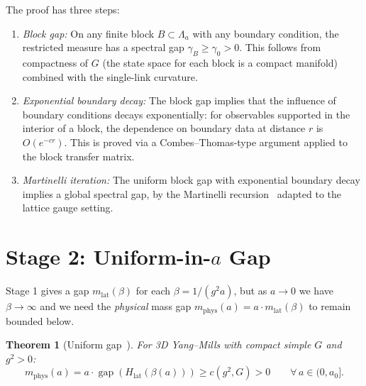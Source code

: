 \documentclass[11pt,a4paper]{article}
\theoremstyle{plain}
\newtheorem{theorem}{Theorem}[section]
\theoremstyle{definition}
\theoremstyle{remark}
\newcommand{\gap}{\operatorname{gap}}
\begin{document}
The proof has three steps:
\begin{enumerate}[label=(\alph*),nosep]
  \item \emph{Block gap:} On any finite block $B \subset
    \Lambda_a$ with any boundary condition, the restricted
    measure has a spectral gap $\gamma_B \ge \gamma_0 > 0$.
    This follows from compactness of $G$ (the state space
    for each block is a compact manifold) combined with the
    single-link curvature.
  \item \emph{Exponential boundary decay:} The block gap
    implies that the influence of boundary conditions
    decays exponentially: for observables supported in
    the interior of a block, the dependence on boundary
    data at distance $r$ is $O(e^{-cr})$.
    This is proved via a Combes--Thomas-type argument
    applied to the block transfer matrix.
  \item \emph{Martinelli iteration:} The uniform block gap
    with exponential boundary decay implies a global
    spectral gap, by the Martinelli recursion~\cite{Martinelli99}
    adapted to the lattice gauge setting.
\end{enumerate}

\section{Stage 2: Uniform-in-$a$ Gap}\label{sec:uniform}

Stage 1 gives a gap $m_{\mathrm{lat}}(\beta)$ for each
$\beta = 1/(g^2 a)$, but as $a \to 0$ we have $\beta \to \infty$
and we need the \emph{physical} mass gap
$m_{\mathrm{phys}}(a) = a \cdot m_{\mathrm{lat}}(\beta)$
to remain bounded below.

\begin{theorem}[Uniform gap~\cite{FontesUniform}]
\label{thm:uniform}
For 3D Yang--Mills with compact simple $G$ and $g^2 > 0$:
\begin{equation}
  m_{\mathrm{phys}}(a) =
  a \cdot \gap(H_{\mathrm{lat}}(\beta(a)))
  \ge c(g^2, G) > 0
  \qquad \forall\, a \in (0, a_0].
\end{equation}
\end{theorem}
\end{document}
